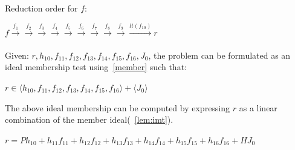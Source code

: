 \begin{Example}
Reduction order for $f:$

$f\xrightarrow[]{f_{1}}\xrightarrow[]{f_2}\xrightarrow[]{f_3}\xrightarrow[]{f_4}\xrightarrow[]{f_5}\xrightarrow[]{f_6}\xrightarrow[]{f_7}\xrightarrow[]{f_8}\xrightarrow[]{f_9}\xrightarrow[]{lt(f_{10})}r$

Given: $r,h_{10},f_{11},f_{12},f_{13},f_{14},f_{15},f_{16},J_0$, the problem can be formulated as an ideal membership test using~\eqref{member} such that:
\begin{center}
$r \in \langle h_{10},f_{11},f_{12},f_{13},f_{14},f_{15},f_{16}\rangle + \langle J_0\rangle$
\end{center}

The above ideal membership can be computed by expressing $r$ as a linear combination of the member ideal(~\autoref{lem:imt}).
\begin{tiny}
$r = Ph_{10} + h_{11}f_{11} + h_{12}f_{12}+h_{13}f_{13}+h_{14}f_{14}+h_{15}f_{15}+h_{16}f_{16}+HJ_0$ 
\end{tiny}



\end{Example}
